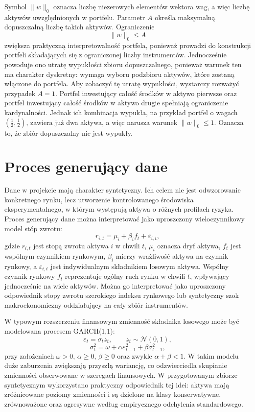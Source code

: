 \documentclass[12pt,a4paper]{article}
\begin{document}
Symbol $\|w\|_0$ oznacza liczbę niezerowych elementów wektora wag, a więc liczbę aktywów uwzględnionych w portfelu. Parametr $A$ określa maksymalną dopuszczalną liczbę takich aktywów. Ograniczenie
\[
    \|w\|_0 \leq A
\]
zwiększa praktyczną interpretowalność portfela, ponieważ prowadzi do konstrukcji portfeli składających się z ograniczonej liczby instrumentów. Jednocześnie powoduje ono utratę wypukłości zbioru dopuszczalnego, ponieważ warunek ten ma charakter dyskretny: wymaga wyboru podzbioru aktywów, które zostaną włączone do portfela.
Aby zobaczyć tę utratę wypukłości, wystarczy rozważyć przypadek $A=1$. Portfel inwestujący całość środków w aktywo pierwsze oraz portfel inwestujący całość środków w aktywo drugie spełniają ograniczenie kardynalności. Jednak ich kombinacja wypukła, na przykład portfel o wagach $(\frac{1}{2},\frac{1}{2})$, zawiera już dwa aktywa, a więc narusza warunek $\|w\|_0 \leq 1$. Oznacza to, że zbiór dopuszczalny nie jest wypukły.

\section{Proces generujący dane}
Dane w projekcie mają charakter syntetyczny. Ich celem nie jest odwzorowanie konkretnego rynku, lecz utworzenie kontrolowanego środowiska eksperymentalnego, w którym występują aktywa o różnych profilach ryzyka. Proces generujący dane można interpretować jako uproszczony wieloczynnikowy model stóp zwrotu:
\[
    r_{i,t} = \mu_i + \beta_i f_t + \varepsilon_{i,t},
\]
gdzie $r_{i,t}$ jest stopą zwrotu aktywa $i$ w chwili $t$, $\mu_i$ oznacza dryf aktywa, $f_t$ jest wspólnym czynnikiem rynkowym, $\beta_i$ mierzy wrażliwość aktywa na czynnik rynkowy, a $\varepsilon_{i,t}$ jest indywidualnym składnikiem losowym aktywa. Wspólny czynnik rynkowy $f_t$ reprezentuje ogólny ruch rynku w chwili $t$, wpływający jednocześnie na wiele aktywów. Można go interpretować jako uproszczony odpowiednik stopy zwrotu szerokiego indeksu rynkowego lub syntetyczny szok makroekonomiczny oddziałujący na cały zbiór instrumentów.

W typowym rozszerzeniu finansowym zmienność składnika losowego może być modelowana procesem GARCH(1,1):
\[
    \varepsilon_t = \sigma_t z_t, \qquad z_t \sim \mathcal{N}(0,1),
\]
\[
    \sigma_t^2 = \omega + \alpha \varepsilon_{t-1}^2 + \beta \sigma_{t-1}^2,
\]
przy założeniach $\omega>0$, $\alpha\ge 0$, $\beta\ge 0$ oraz zwykle $\alpha+\beta<1$. W takim modelu duże zaburzenia zwiększają przyszłą wariancję, co odzwierciedla skupianie zmienności obserwowane w szeregach finansowych. W przygotowanym zbiorze syntetycznym wykorzystano praktyczny odpowiednik tej idei: aktywa mają zróżnicowane poziomy zmienności i są dzielone na klasy konserwatywne, zrównoważone oraz agresywne według empirycznego odchylenia standardowego.
\end{document}
